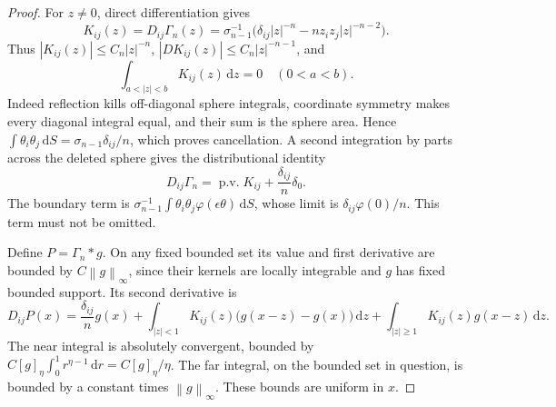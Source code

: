 \documentclass[11pt,a4paper]{article}
\numberwithin{equation}{section}
\theoremstyle{definition}
\theoremstyle{remark}
\newcommand{\dd}{\,\mathrm d}
\newcommand{\dz}{\dd z}
\newcommand{\norm}[1]{\left\lVert#1\right\rVert}
\newcommand{\PV}{\operatorname{p.v.}}
\begin{document}
\begin{proof}
For \(z\ne0\), direct differentiation gives
\begin{equation}\label{eq:kernel}
 K_{ij}(z)=D_{ij}\Gamma_n(z)
 =\sigma_{n-1}^{-1}
 \bigl(\delta_{ij}|z|^{-n}-nz_iz_j|z|^{-n-2}\bigr).
\end{equation}
Thus \(|K_{ij}(z)|\le C_n|z|^{-n}\),
\(|DK_{ij}(z)|\le C_n|z|^{-n-1}\), and
\begin{equation}\label{eq:cancellation}
 \int_{a<|z|<b}K_{ij}(z)\dz=0\quad(0<a<b).
\end{equation}
Indeed reflection kills off-diagonal sphere integrals, coordinate
symmetry makes every diagonal integral equal, and their sum is the sphere
area. Hence \(\int\theta_i\theta_j\dd S=\sigma_{n-1}\delta_{ij}/n\),
which proves cancellation. A second integration by parts across the
deleted sphere gives the distributional identity
\begin{equation}\label{eq:deltaHessian}
 D_{ij}\Gamma_n=\PV K_{ij}+\frac{\delta_{ij}}n\delta_0.
\end{equation}
The boundary term is
\(\sigma_{n-1}^{-1}\int\theta_i\theta_j\varphi(\epsilon\theta)\dd S\),
whose limit is \(\delta_{ij}\varphi(0)/n\). This term must not be omitted.

Define \(P=\Gamma_n*g\). On any fixed bounded set its value and first
derivative are bounded by \(C\norm{g}_\infty\), since their kernels are
locally integrable and \(g\) has fixed bounded support. Its second
derivative is
\begin{equation}\label{eq:potentialHessian}
 D_{ij}P(x)=\frac{\delta_{ij}}n g(x)
 +\int_{|z|<1}K_{ij}(z)\bigl(g(x-z)-g(x)\bigr)\dz
 +\int_{|z|\ge1}K_{ij}(z)g(x-z)\dz.
\end{equation}
The near integral is absolutely convergent, bounded by
\(C[g]_\eta\int_0^1r^{\eta-1}\dd r=C[g]_\eta/\eta\).
The far integral, on the bounded set in question, is bounded by a constant
times \(\norm{g}_\infty\). These bounds are uniform in \(x\).


\end{proof}
\end{document}

